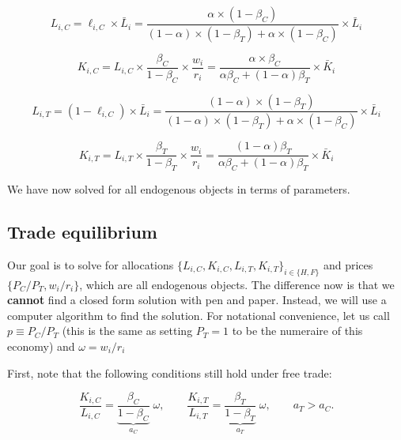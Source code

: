 \documentclass[11pt,letterpaper]{article}
\begin{document}
\begin{equation*}
    \boxed{
    L_{i,C} = \ell_{i,C} \times \bar{L}_i =  \frac{\alpha \times (1-\beta_C)}{(1-\alpha)\times(1-\beta_T)+ \alpha\times(1-\beta_C)} \times \bar{L}_i }
\end{equation*}

\begin{equation*}
    \boxed{
    K_{i,C} = L_{i,C} \times \frac{\beta_C}{1-\beta_C} \times \frac{w_i}{r_i} = \frac{\alpha \times \beta_C}{\alpha \beta_C + (1-\alpha)\beta_T} \times \bar{K}_i
     }
\end{equation*}


\begin{equation*}
    \boxed{
    L_{i,T} = (1-\ell_{i,C}) \times \bar{L}_i =  \frac{(1-\alpha)\times(1-\beta_T)}{(1-\alpha)\times(1-\beta_T)+ \alpha\times(1-\beta_C)} \times \bar{L}_i
     }
\end{equation*}



\begin{equation*}
    \boxed{
    K_{i,T} = L_{i,T} \times \frac{\beta_T}{1-\beta_T} \times \frac{w_i}{r_i} = \frac{ (1-\alpha)\beta_T}{\alpha \beta_C + (1-\alpha)\beta_T} \times \bar{K}_i
     }
\end{equation*}

We have now solved for all endogenous objects in terms of parameters.




\subsection*{Trade equilibrium}


Our goal is to solve for allocations $\{L_{i,C}, K_{i,C}, L_{i,T}, K_{i,T}\}_{i\in\{H,F\}}$ and prices $\{P_{C}/P_T, w_i /r_i\}$, which are all endogenous objects. The difference now is that we \textbf{cannot} find a closed form solution with pen and paper. Instead, we will use a computer algorithm to find the solution. For notational convenience, let us call $p \equiv P_{C}/P_T$ (this is the same as setting $P_T=1$ to be the numeraire of this economy) and $\omega = w_i /r_i$

First, note that the following conditions still hold under free trade:

\[
\frac{K_{i,C}}{L_{i,C}} = 
      \underbrace{\frac{\beta_C}{1-\beta_C}}_{a_C}\;
      \omega,
\qquad
\frac{K_{i,T}}{L_{i,T}} = 
      \underbrace{\frac{\beta_T}{1-\beta_T}}_{a_T}\;
      \omega,
\qquad a_T>a_C.
\]
\end{document}
